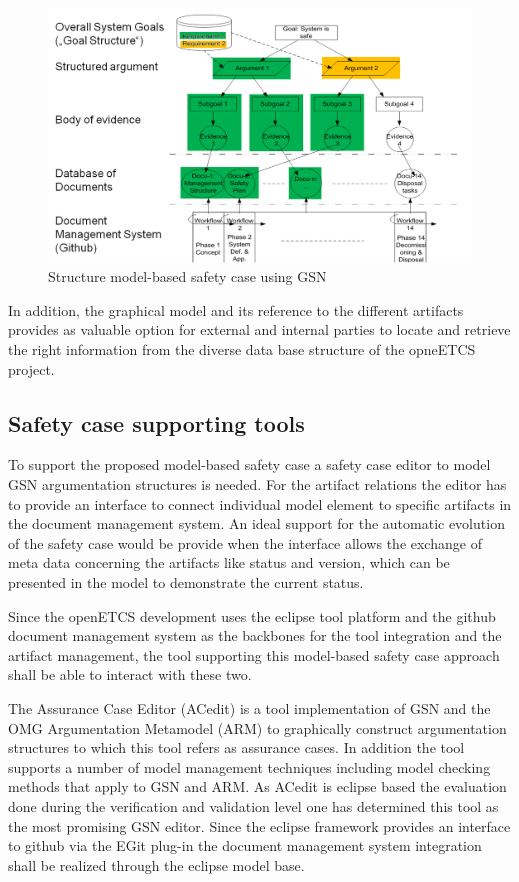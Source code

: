 \documentclass{template/openetcs_report}
\begin{document}
\begin{figure}[htbp]
\centering
\includegraphics[width=0.9\linewidth]{./images/Structure-SC-GSN}
\caption{Structure model-based safety case using GSN}
\label{fig:GSN-SafetyCase}
\end{figure}

 In addition, the graphical model and its reference to the different artifacts provides as valuable option for external and internal parties to locate and retrieve the right information from the diverse data base structure of the opneETCS project.

\subsection{Safety case supporting tools}

To support the proposed model-based safety case a safety case editor to model GSN argumentation structures is needed. For the artifact relations the editor has to provide an interface to connect individual model element to specific artifacts in the document management system. An ideal support for the automatic evolution of the safety case would be provide when the interface allows the exchange of meta data concerning the artifacts like status and version, which can be presented in the model to demonstrate the current status.

Since the openETCS development uses the eclipse tool platform and the github document management system as the backbones for the tool integration and the artifact management, the tool supporting this model-based safety case approach shall be able to interact with these two. 

The Assurance Case Editor (ACedit) \cite{aceditwebsite} is a tool implementation of GSN \cite{GSNwebsite} and the OMG  Argumentation  Metamodel  (ARM) \cite{ARMwebsite} to graphically construct argumentation structures to which this tool refers as assurance cases. In addition the tool supports a number of model management techniques including model checking methods that apply to GSN and ARM. As ACedit is eclipse based the evaluation done during the verification and validation level one has determined this tool as the most promising GSN editor. Since the eclipse framework provides an interface to github via the EGit plug-in the document management system integration shall be realized through the eclipse model base.
\end{document}

